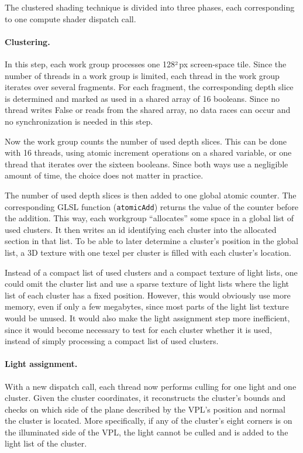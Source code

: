 The clustered shading technique is divided into three phases, each corresponding to one compute shader dispatch call.

\paragraph{Clustering.}
In this step, each work group processes one 128²\,px screen-space tile. Since the number of threads in a work group is limited, each thread in the work group iterates over several fragments. For each fragment, the corresponding depth slice is determined and marked as used in a shared array of 16 booleans. Since no thread writes False or reads from the shared array, no data races can occur and no synchronization is needed in this step.

Now the work group counts the number of used depth slices. This can be done with 16 threads, using atomic increment operations on a shared variable, or one thread that iterates over the sixteen booleans. Since both ways use a negligible amount of time, the choice does not matter in practice.

The number of used depth slices is then added to one global atomic counter. The corresponding GLSL function (\texttt{atomicAdd}) returns the value of the counter before the addition. This way, each workgroup ``allocates'' some space in a global list of used clusters. It then writes an id identifying each cluster into the allocated section in that list. To be able to later determine a cluster's position in the global list, a 3D texture with one texel per cluster is filled with each cluster's location.

Instead of a compact list of used clusters and a compact texture of light lists, one could omit the cluster list and use a sparse texture of light lists where the light list of each cluster has a fixed position. However, this would obviously use more memory, even if only a few megabytes, since most parts of the light list texture would be unused. It would also make the light assignment step more inefficient, since it would become necessary to test for each cluster whether it is used, instead of simply processing a compact list of used clusters.


\paragraph{Light assignment.}
With a new dispatch call, each thread now performs culling for one light and one cluster. Given the cluster coordinates, it reconstructs the cluster's bounds and checks on which side of the plane described by the VPL's position and normal the cluster is located. More specifically, if any of the cluster's eight corners is on the illuminated side of the VPL, the light cannot be culled and is added to the light list of the cluster.

